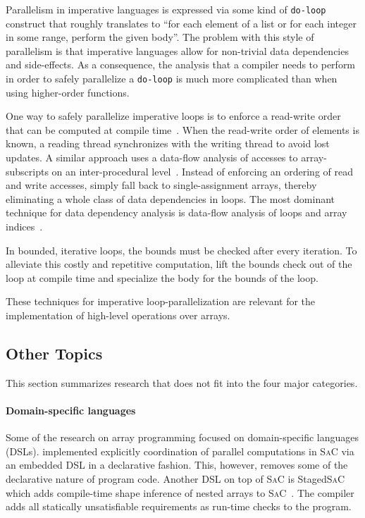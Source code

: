 \documentclass[a4paper]{article}
\newcommand{\sac}{S\textsc{a}C}
\begin{document}
Parallelism in imperative languages is expressed via some kind of
\texttt{do-loop} construct that roughly translates to ``for each
element of a list or for each integer in some range, perform the given
body''. The problem with this style of parallelism is that imperative
languages allow for non-trivial data dependencies and side-effects. As
a consequence, the analysis that a compiler needs to perform in order
to safely parallelize a \texttt{do-loop} is much more complicated than
when using higher-order functions.

One way to safely parallelize imperative loops is to enforce a
read-write order that can be computed at compile
time~\cite{Tang:1990:CTD:77726.255155}. When the read-write order of
elements is known, a reading thread synchronizes with the writing
thread to avoid lost updates. A similar approach uses a data-flow
analysis of accesses to array-subscripts on an inter-procedural
level~\cite{Maydan:1993:AFA:158511.158515}. Instead of enforcing an
ordering of read and write accesses,
\citet{Knobe:1998:ASF:268946.268956} simply fall back to
single-assignment arrays, thereby eliminating a whole class of data
dependencies in loops. The most dominant technique for data dependency
analysis is data-flow analysis of loops and array
indices~\cite{Maydan:1993:AFA:158511.158515,
  Knobe:1998:ASF:268946.268956}.

In bounded, iterative loops, the bounds must be checked after every
iteration. To alleviate this costly and repetitive computation,
\citet{Henriksen:2014:BCI:2627373.2627388} lift the bounds check out
of the loop at compile time and specialize the body for the bounds of
the loop.

These techniques for imperative loop-parallelization are relevant for
the implementation of high-level operations over arrays.

\subsection{Other Topics}
\label{sec:other-topics}

This section summarizes research that does not fit into the four major
categories.

\paragraph{Domain-specific languages}

Some of the research on array programming focused on domain-specific
languages (DSLs). \citet{4228136} implemented explicitly coordination
of parallel computations in \sac{} via an embedded DSL in a
declarative fashion. This, however, removes some of the declarative
nature of program code. Another DSL on top of \sac{} is Staged\sac{}
which adds compile-time shape inference of nested arrays to
\sac{}~\cite{Ureche:2012:SCS:2103746.2103762}. The compiler adds all
statically unsatisfiable requirements as run-time checks to the
program.
\end{document}
